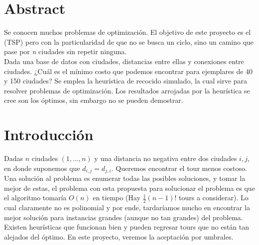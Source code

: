 \documentclass[
10pt,
a4paper,
oneside,
headinclude,footinclude,
BCOR5mm,
]{article}
\begin{document}

\renewcommand{\sectionmark}[1]{\markright{\spacedlowsmallcaps{#1}}} %
\lehead{\mbox{\llap{\small\thepage\kern1em\color{halfgray} \vline}\color{halfgray}\hspace{0.5em}\rightmark\hfil}} %

\pagestyle{scrheadings} %


\setcounter{tocdepth}{2} %

\tableofcontents

\listoffigures

\section*{Abstract}

Se conocen muchos problemas de optimización. El objetivo de este proyecto es el
\TSP (TSP) pero con la particularidad de que no se busca un ciclo, sino un camino
que pase por \textit{n} ciudades sin repetir ninguna.\\
Dada una base de datos con ciudades, distancias entre ellas y conexiones entre
ciudades. ¿Cuál es el mínimo costo que podemos encontrar para ejemplares de 40 y
150 ciudades? Se emplea la heurística de recocido simulado, la cual sirve para
resolver problemas de optimización. Los resultados arrojadas por la heurística se
cree son los óptimos, sin embargo no se pueden demostrar.

\newpage


\section{Introducción}

Dadas $n$ ciudades $(1, ..., n)$ y una distancia no negativa entre dos ciudades
$i,j$, en donde suponemos que $d_{i,j} = d_{j,i}$. Queremos encontrar el tour menos
costoso. Una solución al problema es enumerar todas las posibles soluciones, y
tomar la mejor de estas, el problema con esta propuesta para solucionar el
problema es que el algoritmo tomaría $O(n)$ en tiempo (Hay $\frac{1}{2}(n - 1)!$
tours a considerar). Lo cual claramente no es polinomial y por ende, tardaríamos
mucho en encontrar la mejor solución para instancias grandes (aunque no tan
grandes) del problema.
Existen heurísticas que funcionan bien y pueden regresar tours que no están tan
alejados del óptimo. En este proyecto, veremos la aceptación por umbrales.\\
\end{document}
